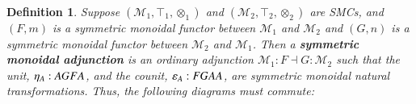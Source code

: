 \documentclass{lmcs}
\newtheorem{definition}[theorem]{Definition}
\let\to\relax
\newcommand{\to}{\rightarrow}
\newcommand{\cat}[1]{\mathcal{#1}}
\newcommand{\p}[1]{\mathsf{p}_{#1}}
\newcommand{\q}[1]{\mathsf{q}_{#1}}
\begin{document}
\begin{definition}
  \label{def:SMCADJ}
  Suppose $(\cat{M}_1,\top_1,\otimes_1)$ and $(\cat{M}_2,\top_2,\otimes_2)$
  are SMCs, and $(F,m)$ is a symmetric monoidal functor between
  $\cat{M}_1$ and $\cat{M}_2$ and $(G,n)$ is a symmetric monoidal
  functor between $\cat{M}_2$ and $\cat{M}_1$.  Then a
  \textbf{symmetric monoidal adjunction} is an ordinary adjunction
  $\cat{M}_1 : F \dashv G : \cat{M}_2$ such that the unit,
  $\eta_A : A \to GFA$, and the counit, $\varepsilon_A : FGA \to A$, are
  symmetric monoidal natural transformations.  Thus, the following
  diagrams must commute:
\end{definition}
\end{document}
